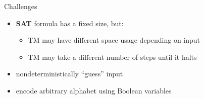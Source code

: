 \documentclass[11pt,usenames,dvipsnames,
hyperref={pdfencoding=auto,psdextra}]{beamer}
\newcommand*{\sat}{\textbf{SAT}}
\begin{document}
\begin{frame}{Challenges}
  \begin{itemize}
    \item \sat{} formula has a fixed size, but: 
      \begin{itemize} 
        \item TM may have different space usage depending on input
        \item TM may take a different number of steps until it halts
      \end{itemize}
    \item nondeterministically ``guess'' input
    \item encode arbitrary alphabet using Boolean variables
  \end{itemize}
\end{frame}
\end{document}
